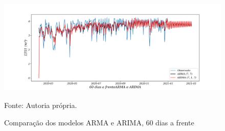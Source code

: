 \begin{figure}[H]
	\centering
	\caption{Comparação dos modelos ARMA e ARIMA, 60 dias a frente }
	\label{fig:60-ARMA-ARIMA24}
	\includegraphics[width=1\linewidth]{Apendices/Figuras/modelagem-24h/60-ARMA-ARIMA}
	
	Fonte: Autoria própria.
\end{figure}